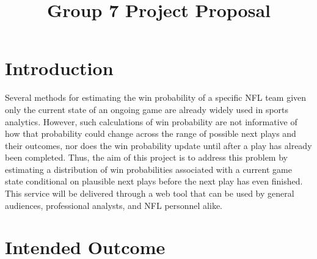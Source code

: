 \documentclass[conference]{IEEEtran}
\begin{document}
\title{Group 7 Project Proposal}

\author{
}

\maketitle

\section{Introduction}

Several methods for estimating the win probability of a specific NFL team given
only the current state of an ongoing game are already widely used in sports
analytics. However, such calculations of win probability are not informative of
how that probability could change across the range of possible next plays and
their outcomes, nor does the win probability update until after a play has
already been completed. Thus, the aim of this project is to address this
problem by estimating a distribution of win probabilities associated with a
current game state conditional on plausible next plays before the next play has
even finished. This service will be delivered through a web tool that can be
used by general audiences, professional analysts, and NFL personnel alike.

\section{Intended Outcome}
\end{document}

